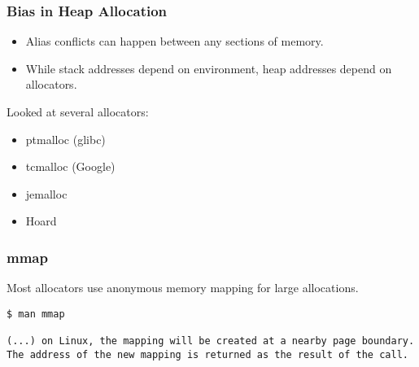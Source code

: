 \documentclass{beamer}
\begin{document}
  \begin{frame}
    \frametitle{Bias in Heap Allocation}

    \begin{itemize}
      \item Alias conflicts can happen between any sections of memory.
      \item While stack addresses depend on environment, heap addresses depend on allocators.
    \end{itemize}

    Looked at several allocators:

    \begin{itemize}
      \item ptmalloc (glibc)
      \item tcmalloc (Google)
      \item jemalloc
      \item Hoard
    \end{itemize}




  \end{frame}

\begin{frame}[fragile]
  \frametitle{mmap}

    Most allocators use anonymous memory mapping for large allocations.

\begin{lstlisting}[frame=single, xleftmargin=.01\textwidth, xrightmargin=.01\textwidth]
$ man mmap

(...) on Linux, the mapping will be created at a nearby page boundary.
The address of the new mapping is returned as the result of the call.

\end{lstlisting}

\end{frame}
\end{document}
